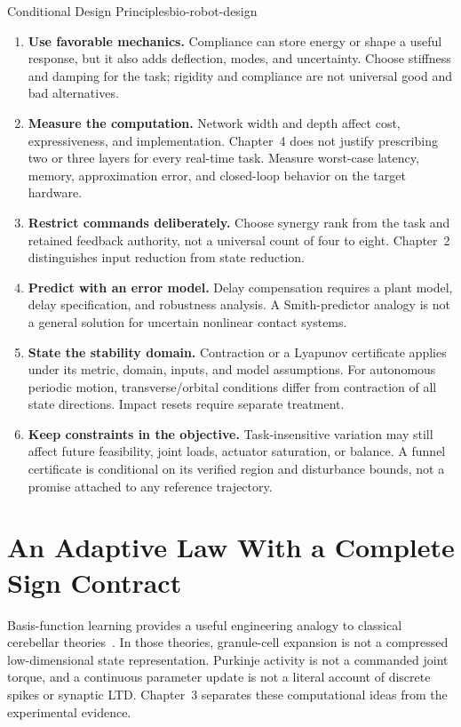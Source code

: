 \begin{insight}{Conditional Design Principles}{bio-robot-design}
\begin{enumerate}
 \item \textbf{Use favorable mechanics.} Compliance can store energy or shape
 a useful response, but it also adds deflection, modes, and uncertainty.
 Choose stiffness and damping for the task; rigidity and compliance are not
 universal good and bad alternatives.
 \item \textbf{Measure the computation.} Network width and depth affect cost,
 expressiveness, and implementation. Chapter~4 does not justify prescribing
 two or three layers for every real-time task. Measure worst-case latency,
 memory, approximation error, and closed-loop behavior on the target hardware.
 \item \textbf{Restrict commands deliberately.} Choose synergy rank from the
 task and retained feedback authority, not a universal count of four to eight.
 Chapter~2 distinguishes input reduction from state reduction.
 \item \textbf{Predict with an error model.} Delay compensation requires a
 plant model, delay specification, and robustness analysis. A Smith-predictor
 analogy is not a general solution for uncertain nonlinear contact systems.
 \item \textbf{State the stability domain.} Contraction or a Lyapunov
 certificate applies under its metric, domain, inputs, and model assumptions.
 For autonomous periodic motion, transverse/orbital conditions differ from
 contraction of all state directions. Impact resets require separate treatment.
 \item \textbf{Keep constraints in the objective.} Task-insensitive variation
 may still affect future feasibility, joint loads, actuator saturation, or
 balance. A funnel certificate is conditional on its verified region and
 disturbance bounds, not a promise attached to any reference trajectory.
\end{enumerate}
\end{insight}

\section{An Adaptive Law With a Complete Sign Contract}

Basis-function learning provides a useful engineering analogy to classical
cerebellar theories~\cite{Marr1969,Albus1971}. In those theories, granule-cell
expansion is not a compressed low-dimensional state representation. Purkinje
activity is not a commanded joint torque, and a continuous parameter update is
not a literal account of discrete spikes or synaptic LTD. Chapter~3 separates
these computational ideas from the experimental evidence.

